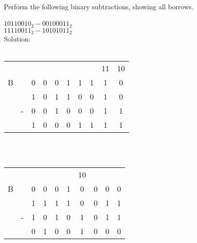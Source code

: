 Perform the following binary subtractions, showing all borrows. \\
\\
$10110010_2 - 00100011_2$ \\
$11110011_2 - 10101011_2$\\

Solution: \\
\\
\begin{tabular}{cccccccccc}
    &   &   &   &   &   &   &   & 11& 10\\
  B &   & 0 & 0 & 0 & 1 & 1 & 1 & 1 & 0 \\
    &   & 1 & 0 & 1 & 1 & 0 & 0 & 1 & 0 \\
    & - & 0 & 0 & 1 & 0 & 0 & 0 & 1 & 1 \\
  \hline
    &   & 1 & 0 & 0 & 0 & 1 & 1 & 1 & 1 \\
\end{tabular} \\
\\
\begin{tabular}{cccccccccc}
    &   &   &   &   &   & 10&   &   &   \\
  B &   & 0 & 0 & 0 & 1 & 0 & 0 & 0 & 0 \\
    &   & 1 & 1 & 1 & 1 & 0 & 0 & 1 & 1 \\
    & - & 1 & 0 & 1 & 0 & 1 & 0 & 1 & 1 \\
  \hline
    &   & 0 & 1 & 0 & 0 & 1 & 0 & 0 & 0 \\
\end{tabular} \\
